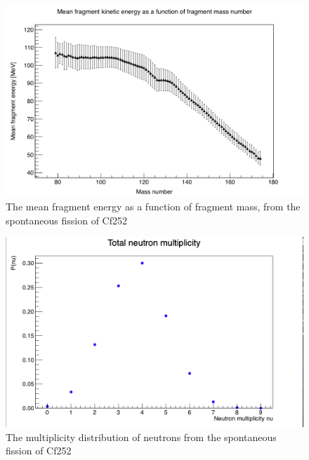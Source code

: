 \documentclass[]{article}
\begin{document}
\begin{figure} [H]
	\centering
	\includegraphics[scale=0.37]{Cf252_sf_mean_fragment_kinetic_enery_function_of_fragment_mass_number.png}
	\caption{The mean fragment energy as a function of fragment mass, from the spontaneous fission of Cf252}
	\label{fig:Cf252_sf_mean_fragment_kinetic_enery_function_of_fragment_mass_number}
\end{figure}

\begin{figure} [H]
	\centering
	\includegraphics[scale=0.36]{Cf252_sf_total_n_mult.png}
	\caption{The multiplicity distribution of neutrons from the spontaneous fission of Cf252}
	\label{fig:Cf252_sf_total_n_mult}
\end{figure}
\end{document}
